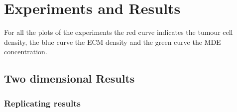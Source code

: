 

\section{Experiments and Results}
For all the plots of the experiments the red curve indicates the tumour cell density, the blue curve the ECM density and the green curve the MDE concentration. 
\subsection{Two dimensional Results}
\subsubsection{Replicating results}


